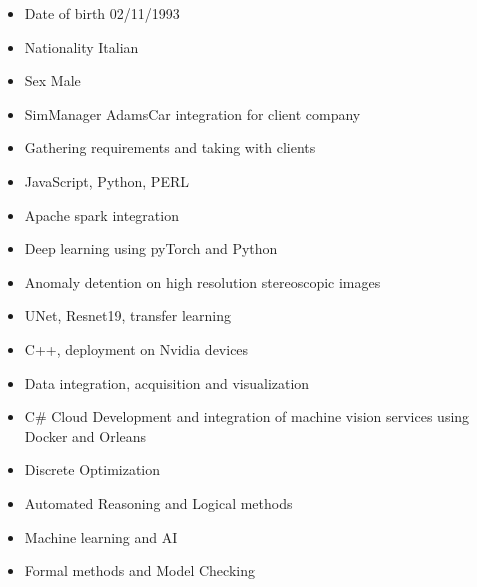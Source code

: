 \documentclass[10pt,a4paper,ragged2e,withhyper]{altacv}
\begin{document}
\begin{paracol}{2}

\begin{itemize}
\item Date of birth 02/11/1993
\item Nationality Italian
\item Sex Male
\end{itemize}


\begin{itemize}
\item SimManager AdamsCar integration for client company
\item Gathering requirements and taking with clients
\item JavaScript, Python, PERL
\item Apache spark integration
\end{itemize}

\divider

\begin{itemize}
\item Deep learning using pyTorch and Python
\item Anomaly detention on high resolution stereoscopic images
\item UNet, Resnet19, transfer learning
\item C++, deployment on Nvidia devices
\item Data integration, acquisition and visualization
\item C\# Cloud Development and integration of machine vision services using Docker and Orleans
\end{itemize}


\begin{itemize}
\item Discrete Optimization
\item Automated Reasoning and Logical methods
\item Machine learning and AI
\item Formal methods and Model Checking
\end{itemize}


\end{paracol}
\end{document}
